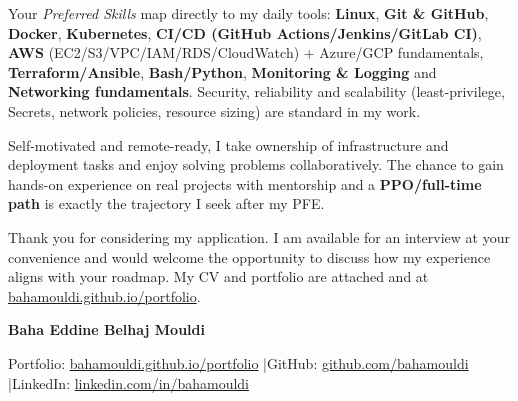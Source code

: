 \documentclass[a4paper,10pt]{article}
\begin{document}
Your \textit{Preferred Skills} map directly to my daily tools: \textbf{Linux}, \textbf{Git \& GitHub}, \textbf{Docker}, \textbf{Kubernetes}, \textbf{CI/CD (GitHub Actions/Jenkins/GitLab CI)}, \textbf{AWS} (EC2/S3/VPC/IAM/RDS/CloudWatch) + Azure/GCP fundamentals, \textbf{Terraform/Ansible}, \textbf{Bash/Python}, \textbf{Monitoring \& Logging} and \textbf{Networking fundamentals}. Security, reliability and scalability (least-privilege, Secrets, network policies, resource sizing) are standard in my work.

Self-motivated and remote-ready, I take ownership of infrastructure and deployment tasks and enjoy solving problems collaboratively. The chance to gain hands-on experience on real projects with mentorship and a \textbf{PPO/full-time path} is exactly the trajectory I seek after my PFE.

Thank you for considering my application. I am available for an interview at your convenience and would welcome the opportunity to discuss how my experience aligns with your roadmap. My CV and portfolio are attached and at \href{https://bahamouldi.github.io/portfolio/}{bahamouldi.github.io/portfolio}.

\vspace{0.6cm}

\begin{flushright}
{\bfseries Baha Eddine Belhaj Mouldi}
\end{flushright}

\vspace{0.3cm}
{\small Portfolio: \href{https://bahamouldi.github.io/portfolio/}{bahamouldi.github.io/portfolio} \quad|\quad GitHub: \href{https://github.com/bahamouldi}{github.com/bahamouldi} \quad|\quad LinkedIn: \href{https://linkedin.com/in/bahamouldi}{linkedin.com/in/bahamouldi}}
\end{document}
